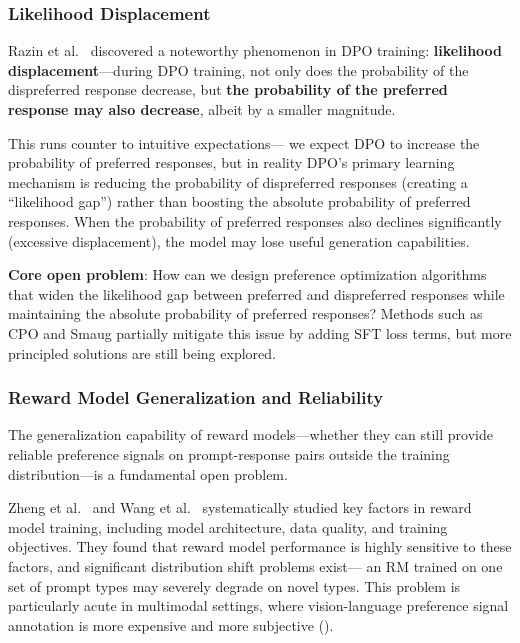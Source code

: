 \subsubsection{Likelihood Displacement}
\label{sec:t2-displacement}

Razin et al.\ \cite{razin2024displacement} discovered a noteworthy phenomenon in DPO training:
\textbf{likelihood displacement}---during DPO training,
not only does the probability of the dispreferred response decrease,
but \textbf{the probability of the preferred response may also decrease},
albeit by a smaller magnitude.

This runs counter to intuitive expectations---
we expect DPO to increase the probability of preferred responses,
but in reality DPO's primary learning mechanism is
reducing the probability of dispreferred responses (creating a ``likelihood gap'')
rather than boosting the absolute probability of preferred responses.
When the probability of preferred responses also declines significantly (excessive displacement),
the model may lose useful generation capabilities.

\begin{openproblembox}
\textbf{Core open problem}: How can we design preference optimization algorithms
that widen the likelihood gap between preferred and dispreferred responses
while maintaining the absolute probability of preferred responses?
Methods such as CPO \cite{xu2024cpo} and Smaug \cite{pal2024smaug}
partially mitigate this issue by adding SFT loss terms,
but more principled solutions are still being explored.
\end{openproblembox}

\subsubsection{Reward Model Generalization and Reliability}
\label{sec:t2-rm-generalization}

The generalization capability of reward models---whether they can still provide reliable preference signals
on prompt-response pairs outside the training distribution---is a fundamental open problem.

Zheng et al.\ \cite{zheng2023secrets1} and Wang et al.\ \cite{wang2024secrets2}
systematically studied key factors in reward model training,
including model architecture, data quality, and training objectives.
They found that reward model performance is highly sensitive to these factors,
and significant distribution shift problems exist---
an RM trained on one set of prompt types may severely degrade on novel types.
This problem is particularly acute in multimodal settings,
where vision-language preference signal annotation is more expensive and more subjective
().


